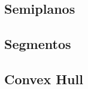 \subsection{Semiplanos}
\raggedbottom
\hrulefill
\subsection{Segmentos}
\raggedbottom
\hrulefill
\subsection{Convex Hull}
\raggedbottom
\hrulefill

